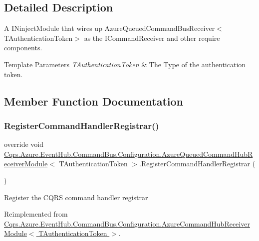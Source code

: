 \subsection{Detailed Description}
A I\+Ninject\+Module that wires up Azure\+Queued\+Command\+Bus\+Receiver$<$\+T\+Authentication\+Token$>$ as the I\+Command\+Receiver and other require components. 


\begin{DoxyTemplParams}{Template Parameters}
{\em T\+Authentication\+Token} & The Type of the authentication token.\\
\hline
\end{DoxyTemplParams}


\subsection{Member Function Documentation}
\mbox{\label{classCqrs_1_1Azure_1_1EventHub_1_1CommandBus_1_1Configuration_1_1AzureQueuedCommandHubReceiverModule_a2513051554179e7d2a4d800375300b53_a2513051554179e7d2a4d800375300b53}} 
\subsubsection{\texorpdfstring{Register\+Command\+Handler\+Registrar()}{RegisterCommandHandlerRegistrar()}}
{\footnotesize\ttfamily override void \hyperlink{classCqrs_1_1Azure_1_1EventHub_1_1CommandBus_1_1Configuration_1_1AzureQueuedCommandHubReceiverModule}{Cqrs.\+Azure.\+Event\+Hub.\+Command\+Bus.\+Configuration.\+Azure\+Queued\+Command\+Hub\+Receiver\+Module}$<$ T\+Authentication\+Token $>$.Register\+Command\+Handler\+Registrar (\begin{DoxyParamCaption}{ }\end{DoxyParamCaption})\hspace{0.3cm}{\ttfamily [virtual]}}



Register the C\+Q\+RS command handler registrar 



Reimplemented from \hyperlink{classCqrs_1_1Azure_1_1EventHub_1_1CommandBus_1_1Configuration_1_1AzureCommandHubReceiverModule_af897af12233fca45836069cc9fcc6f38_af897af12233fca45836069cc9fcc6f38}{Cqrs.\+Azure.\+Event\+Hub.\+Command\+Bus.\+Configuration.\+Azure\+Command\+Hub\+Receiver\+Module$<$ T\+Authentication\+Token $>$}.

